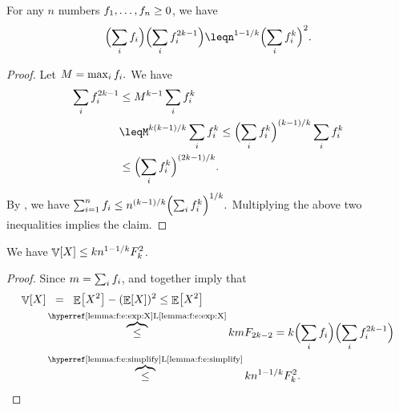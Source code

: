 \begin{lemma}
    For any $n$ numbers $f_1, \ldots,f_n \geq 0$, we have
    \begin{equation*}
        \Bigl({\sum_i \frq_i} \Bigr) \Bigl( \sum_i \frq_i^{2k-1}
        \Bigr) %
        \leq%
        n^{1-1/k} \Bigl(\sum_i \frq_i^{k}\Bigr)^2.
    \end{equation*}
\end{lemma}
\begin{proof}
    Let 
    \begin{math}
        M =\max_i f_i.
    \end{math}
    We have
    \begin{align*}
      \sum_i \frq_i^{2k-1}
      &\leq
        M^{k-1}
        \sum_i \frq_i^{k}
        \\&\leq%
        M^{k(k-1)/k}
        \sum_i \frq_i^{k}
        \leq%
        \Bigl(\sum_i \frq_i^k\Bigr)^{(k-1)/{k}}
        \sum_i \frq_i^{k}
        \\&\leq%
        \Bigl(\sum_i \frq_i^k\Bigr)^{(2k-1)/{k}}.
    \end{align*}
    By , we have
    \begin{math}
        \sum_{i=1}^{n} \frq_i %
        \leq
        n^{(k-1)/k} \Bigl( \sum_i \frq_i^k\Bigr)^{1/k}.%
    \end{math}
    Multiplying the above two inequalities implies the claim.
\end{proof}

\begin{lemma}
    We have $\mathop{\mathbb{V}}\!\left[ {X} \right] \leq k n^{1-1/k} F_k^2$.
\end{lemma}
\begin{proof}
    Since $m = \sum_i f_i$,  and
     together imply that
    \begin{align*}
        \Var{X}%
        &\EQ %
        \Ex{X^2} - (\Ex{X})^2 \leq \Ex{X^2}%
        \\&\overbrace{\LEQ}^{\text{\lemrefshort{f:e:exp:X}}}
        k m \Frq_{2k-2}%
        =%
        k \Bigl({\sum_i \frq_i} \Bigr) \Bigl( \sum_i \frq_i^{2k-1}
        \Bigr) %
        \\&\overbrace{\leq}^{\text{\lemrefshort{f:e:simplify}}}
        k n^{1-1/k} \Frq_k^2.
    \end{align*}
\end{proof}



